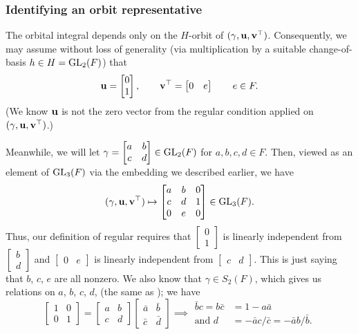 \subsubsection{Identifying an orbit representative}
The orbital integral depends only on the $H$-orbit of $(\gamma, \mathbf u, \mathbf v^\top)$.
Consequently, we may assume without loss of generality
(via multiplication by a suitable change-of-basis $h \in H = \operatorname{GL}_2(F)$) that
\[ \mathbf u = \begin{bmatrix} 0 \\ 1 \end{bmatrix}, \qquad
  \mathbf v^\top = \begin{bmatrix} 0 & e \end{bmatrix} \qquad e \in F. \]
(We know $\mathbf u$ is not the zero vector from the regular condition
applied on $(\gamma, \mathbf u, \mathbf v^\top)$.)

Meanwhile, we will let
$\gamma = \begin{bmatrix} a & b \\ c & d \end{bmatrix} \in \operatorname{GL}_2(F)$
for $a,b,c,d \in F$.
Then, viewed as an element of $\operatorname{GL}_3(F)$ via the embedding we described earlier, we have
\[
  (\gamma, \mathbf u, \mathbf v^\top)
  \mapsto \begin{bmatrix}
    a & b & 0 \\
    c & d & 1 \\
    0 & e & 0
  \end{bmatrix} \in \operatorname{GL}_3(F).
\]
Thus, our definition of regular requires that
$\begin{bmatrix} 0 \\ 1 \end{bmatrix}$
is linearly independent from $\begin{bmatrix} b \\ d \end{bmatrix}$
and
$\begin{bmatrix} 0 & e \end{bmatrix}$
is linearly independent from $\begin{bmatrix} c & d \end{bmatrix}$.
This is just saying that $b$, $c$, $e$ are all nonzero.
We also know that $\gamma \in S_2(F)$, which gives us relations on $a$, $b$, $c$, $d$,
(the same as \cite[equation (7.3.2)]{ref:AFLspherical}); we have
\[
  \begin{bmatrix} 1 & 0 \\ 0 & 1 \end{bmatrix}
  = \begin{bmatrix} a & b \\ c & d \end{bmatrix} \begin{bmatrix} \bar a & \bar b \\ \bar c & \bar d \end{bmatrix}
  \implies
  \begin{aligned}
    \bar b c = b \bar c &= 1 - a \bar a \\
    \text{and } d &= - \bar a c / \bar c = -\bar a b / \bar b.
  \end{aligned}
\]

